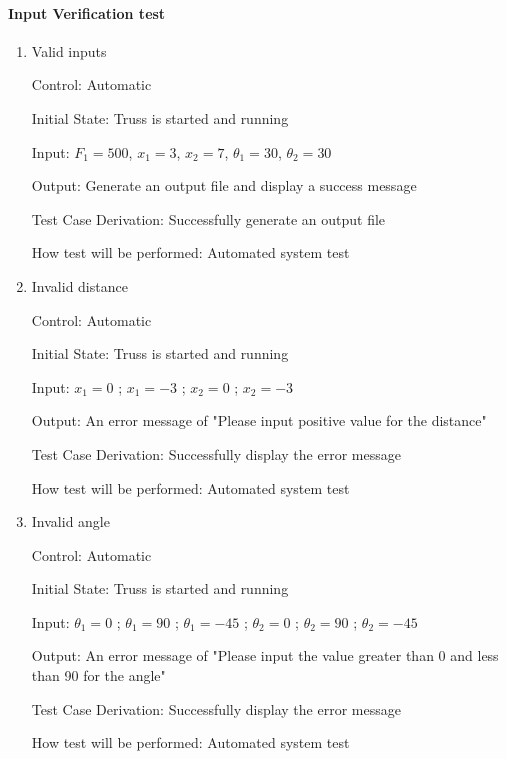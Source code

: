 \documentclass[12pt, titlepage]{article}
\begin{document}
\paragraph{Input Verification test}

\begin{enumerate}

\item{Valid inputs\\}

Control: Automatic

Initial State: Truss is started and running

Input: $F_1 = 500$, $x_1 = 3$, $x_2 = 7$, $\theta_1 = 30$, $\theta_2 = 30$

Output: Generate an output file and display a success message

Test Case Derivation: Successfully generate an output file

How test will be performed: Automated system test

\item{Invalid distance\\}

Control: Automatic
					
Initial State: Truss is started and running
					
Input: $x_1 = 0$ ; $x_1 = -3$ ; $x_2 = 0$ ; $x_2 = -3$
					
Output: An error message of "Please input positive value for the distance"

Test Case Derivation: Successfully display the error message

How test will be performed: Automated system test

\item{Invalid angle\\}

Control: Automatic

Initial State: Truss is started and running

Input: $\theta_1 = 0$ ; $\theta_1 = 90$ ; $\theta_1 = -45$ ; $\theta_2 = 0$ ; 
$\theta_2 = 90$ ; $\theta_2 = -45$

Output: An error message of "Please input the value greater than 0 and less 
than 90 for the angle"

Test Case Derivation: Successfully display the error message

How test will be performed: Automated system test

\end{enumerate}
\end{document}
